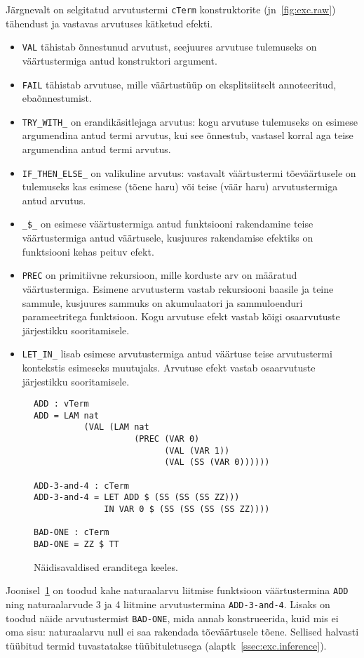 \documentclass[a4paper,12pt]{article}
\begin{document}
Järgnevalt on selgitatud arvutustermi {\tt cTerm} konstruktorite (jn~\ref{fig:exc.raw}) tähendust ja vastavas arvutuses kätketud efekti.
\begin{itemize}
\item {\tt VAL} tähistab õnnestunud arvutust, seejuures arvutuse tulemuseks on väärtustermiga antud konstruktori argument.
\item {\tt FAIL} tähistab arvutuse, mille väärtustüüp on eksplitsiitselt annoteeritud, ebaõnnestumist.
\item {\tt TRY_WITH_} on erandikäsitlejaga arvutus: kogu arvutuse tulemuseks on esimese argumendina antud termi arvutus, kui see õnnestub, vastasel korral aga teise argumendina antud termi arvutus.
\item {\tt IF_THEN_ELSE_} on valikuline arvutus: vastavalt väärtustermi tõeväärtusele on tulemuseks kas esimese (tõene haru) või teise (väär haru) arvutustermiga antud arvutus.
\item {\tt _\$_} on esimese väärtustermiga antud funktsiooni rakendamine teise väärtustermiga antud väärtusele, kusjuures rakendamise efektiks on funktsiooni kehas peituv efekt.
\item {\tt PREC} on primitiivne rekursioon, mille korduste arv on määratud väärtustermiga. Esimene arvutusterm vastab rekursiooni baasile ja teine sammule, kusjuures sammuks on akumulaatori ja sammuloenduri parameetritega funktsioon. Kogu arvutuse efekt vastab kõigi osaarvutuste järjestikku sooritamisele.
\item {\tt LET_IN_} lisab esimese arvutustermiga antud väärtuse teise arvutustermi kontekstis esimeseks muutujaks. Arvutuse efekt vastab osaarvutuste järjestikku sooritamisele.
\end{itemize}

\begin{figure}
  \begin{BVerbatim}
ADD : vTerm
ADD = LAM nat
          (VAL (LAM nat
                    (PREC (VAR 0)
                          (VAL (VAR 1))
                          (VAL (SS (VAR 0))))))

ADD-3-and-4 : cTerm
ADD-3-and-4 = LET ADD $ (SS (SS (SS ZZ)))
              IN VAR 0 $ (SS (SS (SS (SS ZZ))))

BAD-ONE : cTerm
BAD-ONE = ZZ $ TT
  \end{BVerbatim}
  \caption{Näidisavaldised eranditega keeles.}
  \label{fig:exc.raw.ex1}
\end{figure}

Joonisel~\ref{fig:exc.raw.ex1} on toodud kahe naturaalarvu liitmise funktsioon väärtustermina {\tt ADD}
ning naturaalarvude 3 ja 4 liitmine arvutustermina {\tt ADD-3-and-4}.
Lisaks on toodud näide arvutustermist {\tt BAD-ONE}, mida annab konstrueerida,
kuid mis ei oma sisu: naturaalarvu null ei saa rakendada tõeväärtusele tõene.
Sellised halvasti tüübitud termid tuvastatakse tüübituletusega (alaptk~\ref{ssec:exc.inference}).
\end{document}
